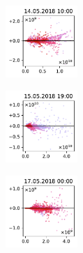 \begin{figure}[H]
    \centering
    \begin{subfigure}
        \centering
        \includegraphics[width=0.30\textwidth,valign=t]{evaluation/figures/perturbations/perturbation-14.05.2018:10.00-biogenic-mul-1.01.pdf}
    \end{subfigure}
    \begin{subfigure}
        \centering
        \includegraphics[width=0.30\textwidth,valign=t]{evaluation/figures/perturbations/perturbation-15.05.2018:19.00-biogenic-mul-1.01.pdf}
    \end{subfigure}
    \begin{subfigure}
        \centering
        \includegraphics[width=0.30\textwidth,valign=t]{evaluation/figures/perturbations/perturbation-17.05.2018:00.00-biogenic-mul-1.01.pdf}
    \end{subfigure}


\end{figure}
